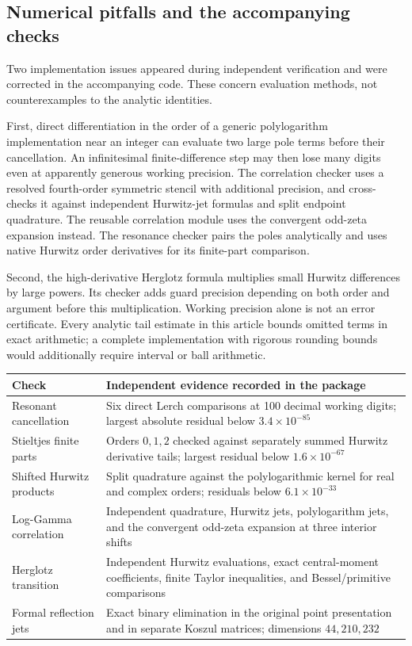 \subsection{Numerical pitfalls and the accompanying checks}
Two implementation issues appeared during independent verification and were
corrected in the accompanying code. These concern evaluation methods, not
counterexamples to the analytic identities.

First, direct differentiation in the order of a generic polylogarithm
implementation near an integer can evaluate two large pole terms before
their cancellation. An infinitesimal finite-difference step may then lose
many digits even at apparently generous working precision. The correlation
checker uses a resolved fourth-order symmetric stencil with additional
precision, and cross-checks it against independent Hurwitz-jet formulas and
split endpoint quadrature. The reusable correlation module uses the
convergent odd-zeta expansion instead. The resonance checker pairs the
poles analytically and uses native Hurwitz order derivatives for its
finite-part comparison.

Second, the high-derivative Herglotz formula multiplies small Hurwitz
differences by large powers. Its checker adds guard precision depending
on both order and argument before this multiplication. Working precision
alone is not an error certificate. Every analytic tail estimate in this
article bounds omitted terms in exact arithmetic; a complete implementation
with rigorous rounding bounds would additionally require interval or ball
arithmetic.

\begin{center}
\begin{tabular}{@{}>{\raggedright\arraybackslash}p{}>{\raggedright\arraybackslash}p{}@{}}
\toprule
Check & Independent evidence recorded in the package\\
\midrule
Resonant cancellation & Six direct Lerch comparisons at 100 decimal
working digits; largest absolute residual below $3.4\times10^{-85}$\\[4pt]
Stieltjes finite parts & Orders $0,1,2$ checked against separately summed
Hurwitz derivative tails; largest residual below $1.6\times10^{-67}$\\[4pt]
Shifted Hurwitz products & Split quadrature against the polylogarithmic
kernel for real and complex orders; residuals below $6.1\times10^{-33}$\\[4pt]
Log-Gamma correlation & Independent quadrature, Hurwitz jets, polylogarithm
jets, and the convergent odd-zeta expansion at three interior shifts\\[4pt]
Herglotz transition & Independent Hurwitz evaluations, exact central-moment
coefficients, finite Taylor inequalities, and Bessel/primitive comparisons\\[4pt]
Formal reflection jets & Exact binary elimination in the original point
presentation and in separate Koszul matrices; dimensions $44,210,232$\\
\bottomrule
\end{tabular}
\end{center}

